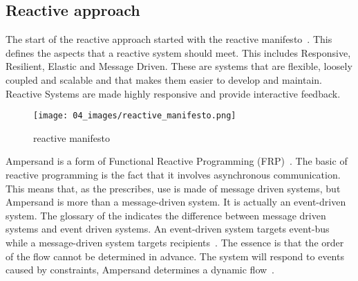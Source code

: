 \subsection{Reactive approach} \label{reactive_approach}

The start of the reactive approach started with the reactive manifesto~.
This defines the aspects that a reactive system should meet.
This includes Responsive, Resilient, Elastic and Message Driven.
These are systems that are flexible, loosely coupled and scalable and that makes them easier to develop and maintain.
Reactive Systems are made highly responsive and provide interactive feedback.
\begin{figure}[H] 
\texttt{[image: 04\_images/reactive\_manifesto.png]}
\centering
\caption{reactive manifesto}
\label{fig:reactive manifesto}
\end{figure}


Ampersand is a form of Functional Reactive Programming (FRP)~\citep{elliott_functional_1997}.
The basic of reactive programming is the fact that it involves asynchronous communication.
This means that, as the  prescribes, use is made of message driven systems, but Ampersand is more than a message-driven system.
It is actually an event-driven system.
The glossary of the  indicates the difference between message driven systems and event driven systems.
An event-driven system targets event-bus while a message-driven system targets recipients~\citep{bainomugisha_survey_2013}.
The essence is that the order of the flow cannot be determined in advance.
The system will respond to events caused by constraints, Ampersand determines a dynamic flow~\citep{joosten_relation_2018}.




